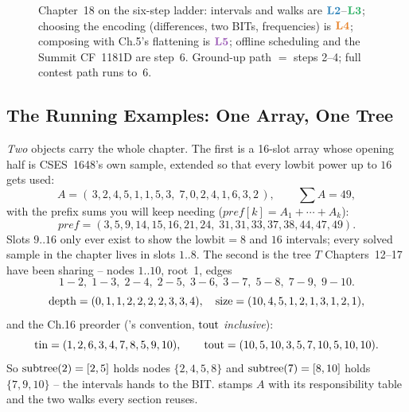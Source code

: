 \begin{figure}[H]
\centering
{}
\caption*{Chapter~18 on the six-step ladder: intervals and walks are
\(\lv2\)--\(\lv3\); choosing the encoding (differences, two BITs,
frequencies) is \(\lv4\); composing with Ch.5's flattening is \(\lv5\);
offline scheduling and the Summit CF~1181D are step~6.  Ground-up path
\(=\) steps 2--4; full contest path runs to~6.}
\end{figure}

\subsection*{The Running Examples: One Array, One Tree}

\emph{Two} objects carry the whole chapter.  The first is a 16-slot array
whose opening half is CSES~1648's own sample, extended so that every
lowbit power up to \(16\) gets used:
\[
  A=(\,3,2,4,5,1,1,5,3,\;7,0,2,4,1,6,3,2\,),\qquad \textstyle\sum A = 49 ,
\]
with the prefix sums you will keep needing
(\(\mathit{pref}[k]=A_1+\cdots+A_k\)):
\[
  \mathit{pref}=(3,5,9,14,15,16,21,24,\;31,31,33,37,38,44,47,49).
\]
Slots \(9..16\) only ever exist to
show the \(\text{lowbit}=8\) and \(16\) intervals; every solved sample in the
chapter lives in slots \(1..8\).  The second is the tree \(T\) Chapters~12--17
have been sharing -- nodes \(1..10\), root~1, edges
\[
  1\!-\!2,\; 1\!-\!3,\; 2\!-\!4,\; 2\!-\!5,\; 3\!-\!6,\; 3\!-\!7,\; 5\!-\!8,\; 7\!-\!9,\; 9\!-\!10 .
\]
\[
  \operatorname{depth}=(0,1,1,2,2,2,2,3,3,4),\quad \operatorname{size}=(10,4,5,1,2,1,3,1,2,1),
\]
and the Ch.16 preorder ('s convention, \(\operatorname{tout}\) \emph{inclusive}):
\[
  \operatorname{tin}=(1,2,6,3,4,7,8,5,9,10),\qquad
  \operatorname{tout}=(10,5,10,3,5,7,10,5,10,10).
\]
So \(\operatorname{subtree}(2)=[2,5]\) holds nodes \(\{2,4,5,8\}\) and
\(\operatorname{subtree}(7)=[8,10]\) holds \(\{7,9,10\}\)
-- the intervals  hands to the BIT.
 stamps \(A\) with its responsibility table and the two
walks every section reuses.

